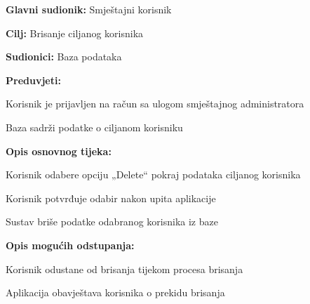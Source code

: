 					\noindent {}
					\begin{packed_item}
						\item \textbf{Glavni sudionik:} Smještajni korisnik
						\item  \textbf{Cilj:} Brisanje ciljanog korisnika
						\item  \textbf{Sudionici:} Baza podataka
						\item  \textbf{Preduvjeti:}
						\item[] \begin{packed_enum}
							\item Korisnik je prijavljen na račun sa ulogom smještajnog administratora
							\item Baza sadrži podatke o ciljanom korisniku
						\end{packed_enum}
						
						\item  \textbf{Opis osnovnog tijeka:}
						\item[] \begin{packed_enum}
							\item Korisnik odabere opciju „Delete“ pokraj podataka ciljanog korisnika
							\item Korisnik potvrđuje odabir nakon upita aplikacije
							\item Sustav briše podatke odabranog korisnika iz baze
						\end{packed_enum}
						
						\item  \textbf{Opis mogućih odstupanja:}
						\item[] \begin{packed_item}
							\item[2.a] Korisnik odustane od brisanja tijekom procesa brisanja
							\item[] \begin{packed_enum}
								\item Aplikacija obavještava korisnika o prekidu brisanja
									\end{packed_enum}
						\end{packed_item}
					\end{packed_item}
					
